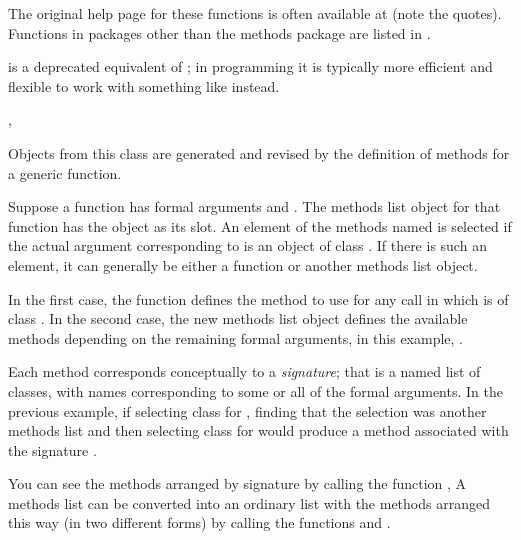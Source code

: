 %
\begin{Details}\relax
The original help page for these functions is often
available at  (note the quotes).
Functions in packages other than the methods package are listed in
.

 is a deprecated equivalent of ; in \R{} programming it is typically more efficient and
flexible to work with something like  instead. 
\end{Details}
%
\begin{SeeAlso}\relax
{}, 
\end{SeeAlso}
%
\begin{Description}\relax
 Objects from this class are generated and revised by the
definition of methods for a generic function.
\end{Description}
%
\begin{Details}\relax
Suppose a function  has
formal arguments  and .  The methods list object for
that function has the object  as its
 slot.  An element of the methods named 
is selected if the actual argument corresponding to  is an
object of class .  If there is such an element, it can
generally be either a function or another methods list object.

In the first case, the function defines the method to use for any call
in which  is of class .  In the second case, the
new methods list object defines the available methods depending on
the remaining formal arguments, in this example, . 

Each method  corresponds conceptually to a \emph{signature};
that is a named list of classes, with names corresponding to some or
all of the formal arguments.  In the previous example, if selecting
class  for , finding that the selection was
another methods list and then selecting class  for
 would produce a method associated with the signature
.

You can see the methods
arranged by signature by calling the function
, 
A methods list can be converted into an ordinary list with the methods arranged this
way (in two different forms)  by calling the functions
 and .

\end{Details}
